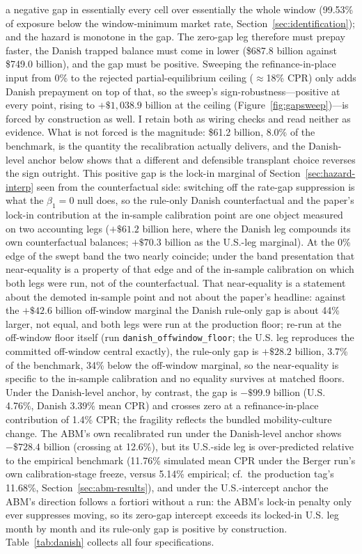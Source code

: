 \documentclass[12pt]{article}
\begin{document}
a negative gap in essentially every cell over essentially the whole window (99.53\% of exposure below the window-minimum market rate, Section~\ref{sec:identification}); and the hazard is monotone in the gap. The zero-gap leg therefore must prepay faster, the Danish trapped balance must come in lower (\$687.8 billion against \$749.0 billion), and the gap must be positive. Sweeping the refinance-in-place input from 0\% to the rejected partial-equilibrium ceiling ($\approx$18\% CPR) only adds Danish prepayment on top of that, so the sweep's sign-robustness---positive at every point, rising to $+\$1{,}038.9$ billion at the ceiling (Figure~\ref{fig:gapsweep})---is forced by construction as well. I retain both as wiring checks and read neither as evidence. What is not forced is the magnitude: \$61.2 billion, 8.0\% of the benchmark, is the quantity the recalibration actually delivers, and the Danish-level anchor below shows that a different and defensible transplant choice reverses the sign outright. This positive gap is the lock-in marginal of Section~\ref{sec:hazard-interp} seen from the counterfactual side: switching off the rate-gap suppression is what the $\beta_1 = 0$ null does, so the rule-only Danish counterfactual and the paper's lock-in contribution at the in-sample calibration point are one object measured on two accounting legs ($+\$61.2$ billion here, where the Danish leg compounds its own counterfactual balances; $+\$70.3$ billion as the U.S.-leg marginal). At the 0\% edge of the swept band the two nearly coincide; under the band presentation that near-equality is a property of that edge and of the in-sample calibration on which both legs were run, not of the counterfactual. That near-equality is a statement about the demoted in-sample point and not about the paper's headline: against the $+\$42.6$ billion off-window marginal the Danish rule-only gap is about 44\% larger, not equal, and both legs were run at the production floor; re-run at the off-window floor itself (run \texttt{danish\_offwindow\_floor}; the U.S. leg reproduces the committed off-window central exactly), the rule-only gap is $+\$28.2$ billion, 3.7\% of the benchmark, 34\% below the off-window marginal, so the near-equality is specific to the in-sample calibration and no equality survives at matched floors. Under the Danish-level anchor, by contrast, the gap is $-\$99.9$ billion (U.S. 4.76\%, Danish 3.39\% mean CPR) and crosses zero at a refinance-in-place contribution of 1.4\% CPR; the fragility reflects the bundled mobility-culture change. The ABM's own recalibrated run under the Danish-level anchor shows $-\$728.4$ billion (crossing at 12.6\%), but its U.S.-side leg is over-predicted relative to the empirical benchmark (11.76\% simulated mean CPR under the Berger run's own calibration-stage freeze, versus 5.14\% empirical; cf.\ the production tag's 11.68\%, Section~\ref{sec:abm-results}), and under the U.S.-intercept anchor the ABM's direction follows a fortiori without a run: the ABM's lock-in penalty only ever suppresses moving, so its zero-gap intercept exceeds its locked-in U.S. leg month by month and its rule-only gap is positive by construction. Table~\ref{tab:danish} collects all four specifications.
\end{document}
